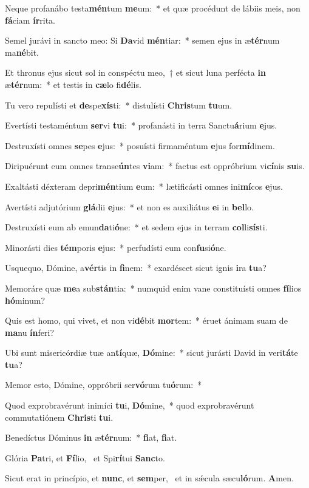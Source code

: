 \item Neque profanábo testa\textbf{mén}tum \textbf{me}um:~* et quæ procédunt de lábiis meis, non \textbf{fá}ciam \textbf{ír}rita.
\item Semel jurávi in sancto meo: Si \textbf{Da}vid \textbf{mén}tiar:~* semen ejus in æ\textbf{tér}num ma\textbf{né}bit.
\item Et thronus ejus sicut sol in conspéctu meo,~† et sicut luna perfécta \textbf{in} æ\textbf{tér}num:~* et testis in \textbf{cæ}lo fi\textbf{dé}lis.
\item Tu vero repulísti et \textbf{de}spe\textbf{xís}ti:~* distulísti \textbf{Chris}tum \textbf{tu}um.
\item Evertísti testaméntum \textbf{ser}vi \textbf{tu}i:~* profanásti in terra Sanctu\textbf{á}rium \textbf{e}jus.
\item Destruxísti omnes \textbf{se}pes \textbf{e}jus:~* posuísti firmaméntum \textbf{e}jus for\textbf{mí}dinem.
\item Diripuérunt eum omnes transe\textbf{ún}tes \textbf{vi}am:~* factus est oppróbrium vi\textbf{cí}nis \textbf{su}is.
\item Exaltásti déxteram depri\textbf{mén}tium \textbf{e}um:~* lætificásti omnes ini\textbf{mí}cos \textbf{e}jus.
\item Avertísti adjutórium \textbf{glá}dii \textbf{e}jus:~* et non es auxiliátus \textbf{e}i in \textbf{bel}lo.
\item Destruxísti eum ab emun\textbf{da}ti\textbf{ó}ne:~* et sedem ejus in terram \textbf{col}li\textbf{sís}ti.
\item Minorásti dies \textbf{tém}poris \textbf{e}jus:~* perfudísti eum con\textbf{fu}si\textbf{ó}ne.
\item Usquequo, Dómine, a\textbf{vér}tis in \textbf{fi}nem:~* exardéscet sicut ignis \textbf{i}ra \textbf{tu}a?
\item Memoráre quæ \textbf{me}a sub\textbf{stán}tia:~* numquid enim vane constituísti omnes \textbf{fí}lios \textbf{hó}minum?
\item Quis est homo, qui vivet, et non vi\textbf{dé}bit \textbf{mor}tem:~* éruet ánimam suam de \textbf{ma}nu \textbf{ín}feri?
\item Ubi sunt misericórdiæ tuæ an\textbf{tí}quæ, \textbf{Dó}mine:~* sicut jurásti David in veri\textbf{tá}te \textbf{tu}a?
\item Memor esto, Dómine, oppróbrii ser\textbf{vó}rum tu\textbf{ó}rum:~* 
\item Quod exprobravérunt inimíci \textbf{tu}i, \textbf{Dó}mine,~* quod exprobravérunt commutatiónem \textbf{Chris}ti \textbf{tu}i.
\item Benedíctus Dóminus \textbf{in} æ\textbf{tér}num:~* \textbf{fi}at, \textbf{fi}at.
\item Glória \textbf{Pa}tri, et \textbf{Fí}lio,~\psstar{} et Spi\textbf{rí}tui \textbf{Sanc}to.
\item Sicut erat in princípio, et \textbf{nunc}, et \textbf{sem}per,~\psstar{} et in sǽcula sæcu\textbf{ló}rum. \textbf{A}men.
